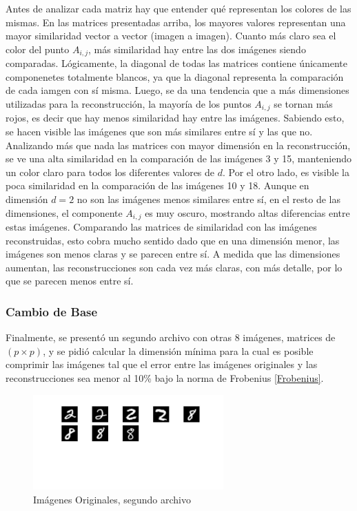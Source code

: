\documentclass[12pt,a4]{article} %
\begin{document}
Antes de analizar cada matriz hay que entender qué representan los colores de las mismas. En las matrices presentadas arriba, los mayores valores representan una mayor similaridad vector a vector (imagen a imagen). Cuanto más claro sea el color del punto $A_{i,j}$, más similaridad hay entre las dos imágenes siendo comparadas. Lógicamente, la diagonal de todas las matrices contiene únicamente componenetes totalmente blancos, ya que la diagonal representa la comparación de cada iamgen con sí misma. Luego, se da una tendencia que a más dimensiones utilizadas para la reconstrucción, la mayoría de los puntos $A_{i,j}$ se tornan más rojos, es decir que hay menos similaridad hay entre las imágenes. Sabiendo esto, se hacen visible las imágenes que son más similares entre sí y las que no. Analizando más que nada las matrices con mayor dimensión en la reconstrucción, se ve una alta similaridad en la comparación de las imágenes 3 y 15, manteniendo un color claro para todos los diferentes valores de $d$. Por el otro lado, es visible la poca similaridad en la comparación de las imágenes 10 y 18. Aunque en dimensión $d = 2$ no son las imágenes menos similares entre sí, en el resto de las dimensiones, el componente $A_{i,j}$ es muy oscuro, mostrando altas diferencias entre estas imágenes. Comparando las matrices de similaridad con las imágenes reconstruidas, esto cobra mucho sentido dado que en una dimensión menor, las imágenes son menos claras y se parecen entre sí. A medida que las dimensiones aumentan, las reconstrucciones son cada vez más claras, con más detalle, por lo que se parecen menos entre sí.
\\

\subsubsection{Cambio de Base}
Finalmente, se presentó un segundo archivo con otras 8 imágenes, matrices de $(p \times p)$, y se pidió calcular la dimensión mínima para la cual es posible comprimir las imágenes tal que el error entre las imágenes originales y las reconstrucciones sea menor al 10\% bajo la norma de Frobenius \ref{Frobenius}.

\begin{figure}[H]
    \centering
    \includegraphics[width=0.65\textwidth]{latex_project/Graficos_ej2/original_images2.jpeg}
    \caption{Imágenes Originales, segundo archivo}
    \label{fig:original_images2}
\end{figure}
\end{document}

